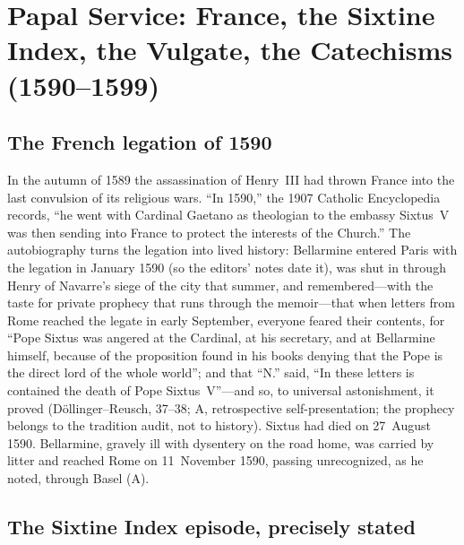 \section{Papal Service: France, the Sixtine Index, the Vulgate, the
Catechisms (1590--1599)}

\subsection{The French legation of 1590}

In the autumn of 1589 the assassination of Henry~III had thrown
France into the last convulsion of its religious wars. ``In 1590,''
the 1907 Catholic Encyclopedia records, ``he went with Cardinal
Gaetano as theologian to the embassy Sixtus~V was then sending into
France to protect the interests of the Church.'' The autobiography
turns the legation into lived history: Bellarmine entered Paris with
the legation in January 1590 (so the editors' notes date it), was
shut in through Henry of Navarre's siege of the city that summer,
and remembered---with the taste for private prophecy that runs
through the memoir---that when letters from Rome
reached the legate in early September, everyone feared their
contents, for ``Pope Sixtus was angered at the Cardinal, at his
secretary, and at Bellarmine himself, because of the proposition
found in his books denying that the Pope is the direct lord of the
whole world''; and that ``N.'' said, ``In these letters is contained
the death of Pope Sixtus~V''---and so, to universal astonishment, it
proved (D\"ollinger--Reusch, 37--38; A, retrospective
self-presentation; the prophecy belongs to the tradition audit, not
to history). Sixtus had died on 27~August 1590. Bellarmine, gravely
ill with dysentery on the road home, was carried by litter and
reached Rome on 11~November 1590, passing unrecognized, as he
noted, through Basel (A).

\subsection{The Sixtine Index episode, precisely stated}

